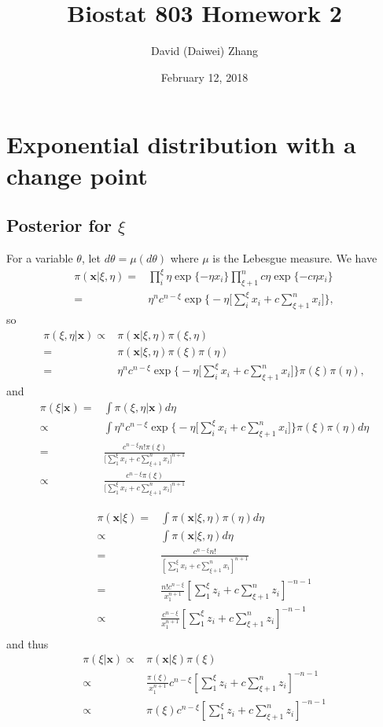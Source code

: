 \documentclass[12pt]{article}
\title{Biostat 803 Homework 2}
\date{February 12, 2018}
\author{David (Daiwei) Zhang}
\begin{document}
\maketitle

\section{Exponential distribution with a change point}
\subsection{Posterior for $\xi$}
For a variable $\theta$, let $d\theta = \mu(d\theta)$
where $\mu$ is the Lebesgue measure.
We have
\begin{align*}
\pi(\boldsymbol{x} | \xi, \eta)
= & \prod_i^\xi \eta \exp\{ -\eta x_i \}
\prod_{\xi+1}^n c \eta \exp\{ -c \eta x_i \} \\
= & \eta^n c^{n - \xi} \exp\big\{ -\eta\Big[\sum_i^\xi x_i + c \sum_{\xi+1}^n x_i\Big]\Big\},
\end{align*}
so
\begin{align*}
  \pi(\xi, \eta | \bm{x})
  \propto & \pi(\bm{x} | \xi, \eta) \pi(\xi, \eta) \\
  = & \pi(\bm{x} | \xi, \eta) \pi(\xi) \pi(\eta) \\
  = & \eta^n c^{n - \xi} \exp\Big\{ -\eta\Big[\sum_i^\xi x_i + c \sum_{\xi+1}^n x_i\Big]\Big\} \pi(\xi) \pi(\eta),
\end{align*}
and
\begin{align*}
  \pi(\xi | \bm{x})
  = & \int \pi(\xi, \eta| \bm{x}) d\eta \\
  \propto & \int \eta^n c^{n - \xi} \exp\Big\{ -\eta\Big[\sum_i^\xi x_i + c \sum_{\xi+1}^n x_i\Big]\Big\} \pi(\xi) \pi(\eta) d\eta \\
  = & \frac{c^{n-\xi} n! \pi(\xi)}{\Big[\sum_1^\xi x_i + c\sum_{\xi+1}^n x_i\Big]^{n+1}}  \\
  \propto & \frac{c^{n-\xi} \pi(\xi)}{\Big[\sum_1^\xi x_i + c\sum_{\xi+1}^n x_i\Big]^{n+1}} 
\end{align*}

\begin{align*}
\pi(\boldsymbol{x} | \xi)
= & \int \pi(\boldsymbol{x} | \xi, \eta) \pi(\eta) d\eta \\
\propto & \int \pi(\boldsymbol{x} | \xi, \eta) d\eta \\
= & \frac{c^{n-\xi} n!}{[\sum_1^\xi x_i + c\sum_{\xi+1}^n x_i]^{n+1}} \\
= & \frac{n! c^{n-\xi}}{x_1^{n+1}} [\sum_1^\xi z_i + c\sum_{\xi+1}^n z_i]^{-n-1} \\
\propto & \frac{c^{n-\xi}}{x_1^{n+1}} [\sum_1^\xi z_i + c\sum_{\xi+1}^n z_i]^{-n-1} \\
\end{align*}
and thus
\begin{align*}
\pi(\xi | \boldsymbol{x})
  \propto & \pi(\boldsymbol{x} | \xi) \pi(\xi) \\
\propto & \frac{\pi(\xi)}{x_1^{n+1}} c^{n-\xi}[\sum_1^\xi z_i + c\sum_{\xi+1}^n z_i]^{-n-1} \\
\propto & \pi(\xi) c^{n-\xi}[\sum_1^\xi z_i + c\sum_{\xi+1}^n z_i]^{-n-1} 
\end{align*}
\end{document}
